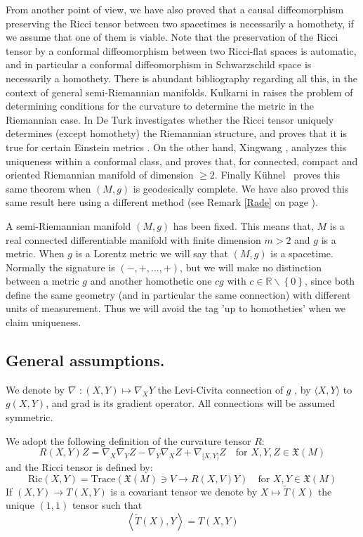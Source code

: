 \documentclass{amsart}%
\theoremstyle{plain}
\numberwithin{equation}{section}
\begin{document}
From another point of view, we have also proved that a causal diffeomorphism
preserving the Ricci tensor between two spacetimes is necessarily a homothety,
if we assume that one of them is viable. Note that the preservation of the
Ricci tensor by a conformal diffeomorphism between two Ricci-flat spaces is
automatic, and in particular a conformal diffeomorphism in Schwarzschild space
is necessarily a homothety. There is abundant bibliography regarding all this,
in the context of general semi-Riemannian manifolds. Kulkarni in
\cite{Kul1}\cite{Kul} raises the problem of determining conditions for the
curvature to determine the metric in the Riemannian case. In \cite{Turk} De
Turk investigates whether the Ricci tensor uniquely determines (except
homothety) the Riemannian structure, and proves that it is true for certain
Einstein metrics . On the other hand, Xingwang \cite{Xing}, analyzes this
uniqueness within a conformal class, and proves that, for connected, compact
and oriented Riemannian manifold of dimension $\geq2$. Finally K\"{u}hnel
\cite{Kun} \ proves this same theorem when $(M,g)$ is geodesically complete.
We have also proved this same result here using a different method (see Remark
\ref{Rade} on page \pageref{Rade}).

A semi-Riemannian manifold $\left(  M,g\right)  $ has been fixed. This means
that, $M$ is a real connected differentiable manifold with finite dimension
$m>2$ and $g$ is a metric. When $g$ is a Lorentz metric we will say that
$\left(  M,g\right)  $ is a spacetime. Normally the signature is
$(-,+,...,+)$, but we will make no distinction between a metric $g$ and
another homothetic one $cg$ with $c\in\mathbb{R}\backslash\left\{  0\right\}
$, since both define the same geometry (and in particular the same connection)
with different units of measurement. Thus we will avoid the tag 'up to
homotheties' when we claim uniqueness.

\subsection{General assumptions.}

We denote by $\nabla$ $:\left(  X,Y\right)  \mapsto\nabla_{X}Y$ the
Levi-Civita connection of $g$ , by $\langle X,Y\rangle$ to $g\left(
X,Y\right)  $, and \textrm{grad} is its gradient operator. All connections
will be assumed symmetric.

We adopt the following definition of the curvature tensor $R$:
\[
R(X,Y)Z=\nabla_{X}\nabla_{Y}Z-\nabla_{Y}\nabla_{X}Z+\nabla_{\lbrack
X,Y]}Z\quad\text{for }X,Y,Z\in\mathfrak{X}(M)
\]
and the Ricci tensor is defined by:
\[
\mathrm{Ric}(X,Y)=\mathrm{Trace}(\mathfrak{X}(M)\ni V\longrightarrow
R(X,V)Y)\quad\text{for }X,Y\in\mathfrak{X}(M)
\]
If $\left(  X,Y\right)  \rightarrow T\left(  X,Y\right)  $ is a covariant
tensor we denote by $X\mapsto\widetilde{T}\left(  X\right)  $ the unique
$\left(  1,1\right)  $ tensor such that
\[
\left\langle \widetilde{T}\left(  X\right)  ,Y\right\rangle =T\left(
X,Y\right)
\]
\end{document}
